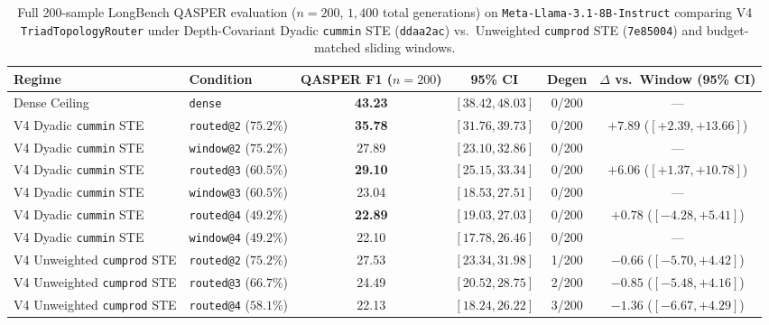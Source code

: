\documentclass[11pt,a4paper]{article}
\begin{document}
\begin{table}[h]
\centering
\caption{Full 200-sample LongBench QASPER evaluation ($n=200$, $1{,}400$ total generations) on \texttt{Meta-Llama-3.1-8B-Instruct} comparing V4 \texttt{TriadTopologyRouter} under Depth-Covariant Dyadic \texttt{cummin} STE (\texttt{ddaa2ac}) vs.\ Unweighted \texttt{cumprod} STE (\texttt{7e85004}) and budget-matched sliding windows.}
\label{tab:qasper_v4}
\begin{tabular}{@{}llcccc@{}}
\toprule
Regime & Condition & QASPER F1 ($n=200$) & 95\% CI & Degen & $\Delta$ vs.\ Window (95\% CI) \\
\midrule
Dense Ceiling & \texttt{dense} & \textbf{43.23} & $[38.42, 48.03]$ & 0/200 & --- \\
\midrule
V4 Dyadic \texttt{cummin} STE & \texttt{routed@2} ($75.2\%$) & \textbf{35.78} & $[31.76, 39.73]$ & 0/200 & $\mathbf{+7.89}$ ($[+2.39, +13.66]$) \\
V4 Dyadic \texttt{cummin} STE & \texttt{window@2} ($75.2\%$) & 27.89 & $[23.10, 32.86]$ & 0/200 & --- \\
V4 Dyadic \texttt{cummin} STE & \texttt{routed@3} ($60.5\%$) & \textbf{29.10} & $[25.15, 33.34]$ & 0/200 & $\mathbf{+6.06}$ ($[+1.37, +10.78]$) \\
V4 Dyadic \texttt{cummin} STE & \texttt{window@3} ($60.5\%$) & 23.04 & $[18.53, 27.51]$ & 0/200 & --- \\
V4 Dyadic \texttt{cummin} STE & \texttt{routed@4} ($49.2\%$) & \textbf{22.89} & $[19.03, 27.03]$ & 0/200 & $\mathbf{+0.78}$ ($[-4.28, +5.41]$) \\
V4 Dyadic \texttt{cummin} STE & \texttt{window@4} ($49.2\%$) & 22.10 & $[17.78, 26.46]$ & 0/200 & --- \\
\midrule
V4 Unweighted \texttt{cumprod} STE & \texttt{routed@2} ($75.2\%$) & 27.53 & $[23.34, 31.98]$ & 1/200 & $-0.66$ ($[-5.70, +4.42]$) \\
V4 Unweighted \texttt{cumprod} STE & \texttt{routed@3} ($66.7\%$) & 24.49 & $[20.52, 28.75]$ & 2/200 & $-0.85$ ($[-5.48, +4.16]$) \\
V4 Unweighted \texttt{cumprod} STE & \texttt{routed@4} ($58.1\%$) & 22.13 & $[18.24, 26.22]$ & 3/200 & $-1.36$ ($[-6.67, +4.29]$) \\
\bottomrule
\end{tabular}
\end{table}
\end{document}
